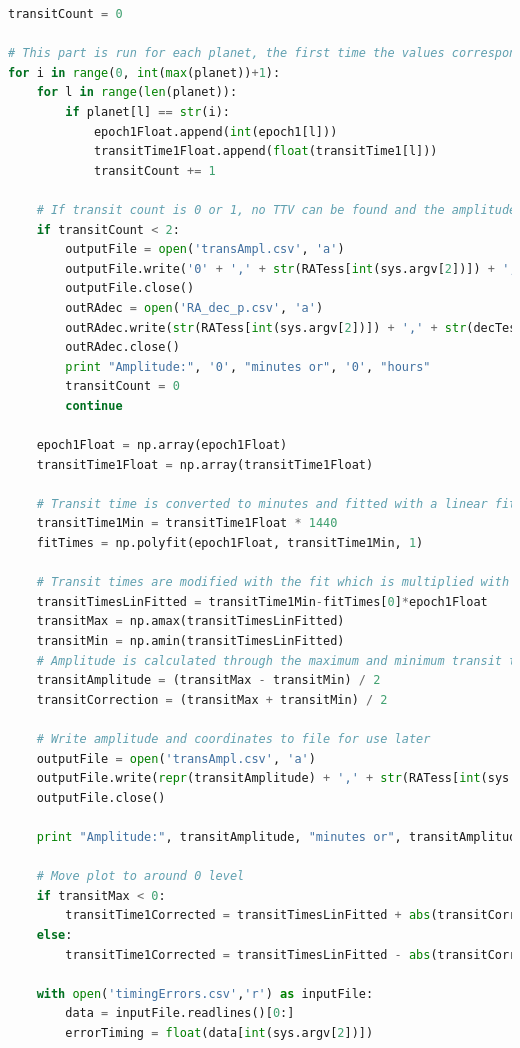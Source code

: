 \documentclass[12pt]{report}
\begin{document}
\begin{appendix}
\begin{lstlisting}[language=Python]
transitCount = 0

# This part is run for each planet, the first time the values corresponding to the first planet is saved, next time the second and so on.
for i in range(0, int(max(planet))+1):
	for l in range(len(planet)):
		if planet[l] == str(i):
			epoch1Float.append(int(epoch1[l]))
			transitTime1Float.append(float(transitTime1[l]))
			transitCount += 1
	
	# If transit count is 0 or 1, no TTV can be found and the amplitude is set to 0
	if transitCount < 2:
		outputFile = open('transAmpl.csv', 'a')
		outputFile.write('0' + ',' + str(RATess[int(sys.argv[2])]) + ',' + str(decTess[int(sys.argv[2])]))
		outputFile.close()
		outRAdec = open('RA_dec_p.csv', 'a')
		outRAdec.write(str(RATess[int(sys.argv[2])]) + ',' + str(decTess[int(sys.argv[2])]))
		outRAdec.close()
		print "Amplitude:", '0', "minutes or", '0', "hours"
		transitCount = 0
		continue
		
	epoch1Float = np.array(epoch1Float)
	transitTime1Float = np.array(transitTime1Float)
	
	# Transit time is converted to minutes and fitted with a linear fit
	transitTime1Min = transitTime1Float * 1440
	fitTimes = np.polyfit(epoch1Float, transitTime1Min, 1)
	
	# Transit times are modified with the fit which is multiplied with the epoch.
	transitTimesLinFitted = transitTime1Min-fitTimes[0]*epoch1Float
	transitMax = np.amax(transitTimesLinFitted)
	transitMin = np.amin(transitTimesLinFitted)
	# Amplitude is calculated through the maximum and minimum transit time and "correction" is to move the plot to around 0 level.
	transitAmplitude = (transitMax - transitMin) / 2
	transitCorrection = (transitMax + transitMin) / 2

	# Write amplitude and coordinates to file for use later
	outputFile = open('transAmpl.csv', 'a')
	outputFile.write(repr(transitAmplitude) + ',' + str(RATess[int(sys.argv[2])]) + ',' + str(decTess[int(sys.argv[2])]))
	outputFile.close()

	print "Amplitude:", transitAmplitude, "minutes or", transitAmplitude/60, "hours"
	
	# Move plot to around 0 level
	if transitMax < 0:
		transitTime1Corrected = transitTimesLinFitted + abs(transitCorrection)
	else:
		transitTime1Corrected = transitTimesLinFitted - abs(transitCorrection)

	with open('timingErrors.csv','r') as inputFile:
		data = inputFile.readlines()[0:]
		errorTiming = float(data[int(sys.argv[2])])
	

\end{lstlisting}
\end{appendix}
\end{document}
